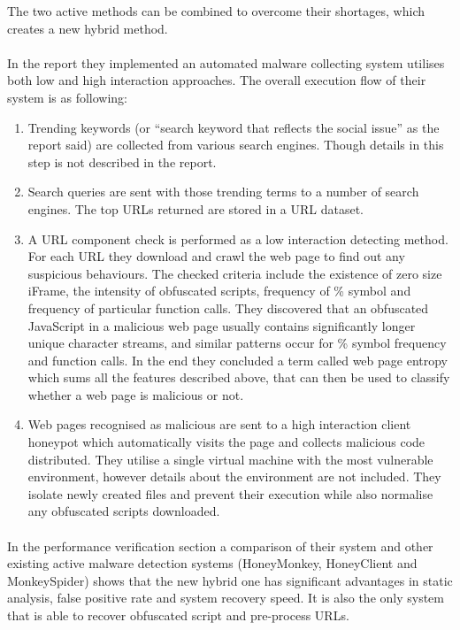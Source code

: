 The two active methods can be combined to overcome their shortages, which 
creates a new hybrid method. 
\paragraph{}
In the report they implemented an automated malware collecting system 
utilises both low and high interaction approaches. The overall execution flow 
of their system is as following:
\begin{enumerate}
\item Trending keywords (or ``search keyword that reflects the social issue'' 
as the report said) are collected from various search engines. Though details 
in this step is not described in the report. 
\item Search queries are sent with those trending terms to a number of search 
engines. The top URLs returned are stored in a URL dataset. 
\item A URL component check is performed as a low interaction detecting 
method. For each URL they download and crawl the web page to find out any 
suspicious behaviours. The checked criteria include the existence of zero 
size iFrame, the intensity of obfuscated scripts, frequency of \% symbol and 
frequency of particular function calls. They discovered that an 
obfuscated JavaScript in a malicious web page usually contains significantly 
longer unique character streams, and similar patterns occur for \% symbol 
frequency and function calls. In the end they concluded a term called web page 
entropy which sums all the features described above, that can then be used to 
classify whether a web page is malicious or not. 
\item Web pages recognised as malicious are sent to a high interaction client 
honeypot which automatically visits the page and collects malicious code 
distributed. They utilise a single virtual machine with the most vulnerable 
environment, however details about the environment are not included. They 
isolate newly created files and prevent their execution while also normalise 
any obfuscated scripts downloaded. 
\end{enumerate} 
\paragraph{}
In the performance verification section a comparison of 
their system and other existing active malware detection systems (HoneyMonkey, 
HoneyClient and MonkeySpider) shows that the new hybrid one has significant 
advantages in static analysis, false positive rate and system recovery speed. 
It is also the only system that is able to recover obfuscated script and 
pre-process URLs. 
